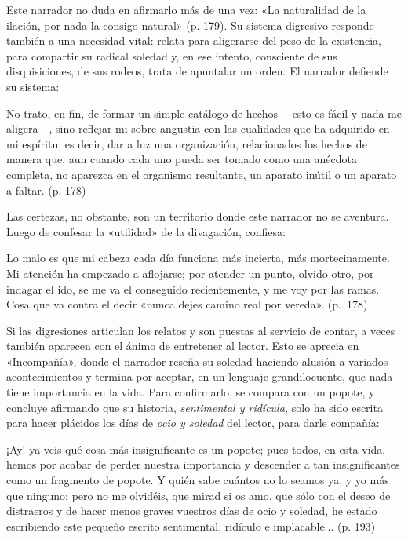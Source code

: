 \documentclass[14pt,twoside,final]{extbook} %
\begin{document}
Este narrador no duda en afirmarlo más de una vez: «La naturalidad de la ilación, por nada la consigo natural» (p. 179). Su sistema digresivo responde también a una necesidad vital: relata para
aligerarse del peso de la existencia, para compartir su radical soledad y, en ese intento, consciente de sus disquisiciones, de sus rodeos, trata de apuntalar un orden. El narrador defiende su sistema:
\begin{quoting}
No trato, en fin, de formar un simple catálogo de hechos ---esto es fácil y nada me aligera---, sino reflejar mi sobre angustia con las cualidades que ha adquirido en mi espíritu, es decir, dar a luz una organización, relacionados los hechos de manera que, aun cuando cada uno pueda ser tomado como una anécdota completa, no aparezca en el organismo resultante, un aparato inútil o un aparato a faltar. (p. 178)
\end{quoting}
Las certezas, no obstante, son un territorio donde este narrador no se aventura. Luego de confesar la «utilidad» de la divagación, confiesa:
\begin{quoting}
Lo malo es que mi cabeza cada día funciona más incierta, más mortecinamente. Mi atención ha empezado a aflojarse; por atender un punto, olvido otro, por indagar el ido, se me va el conseguido recientemente, y me voy por las ramas. Cosa que va contra el decir «nunca dejes camino real por vereda». (p.~178)
\end{quoting}
Si las digresiones articulan los relatos y son puestas al servicio de contar, a veces también aparecen con el ánimo de entretener al lector. Esto se aprecia en «Incompañía», donde el narrador reseña su soledad haciendo alusión a variados acontecimientos y termina por aceptar, en un lenguaje grandilocuente, que nada tiene importancia en la vida. Para confirmarlo, se compara con un popote, y concluye afirmando que su historia, \emph{sentimental y ridícula,} solo ha sido escrita para hacer plácidos los días de \emph{ocio y soledad} del lector, para darle compañía:
\begin{quoting}
¡Ay! ya veis qué cosa más insignificante es un popote; pues todos, en esta vida, hemos por acabar de perder nuestra importancia y descender a tan insignificantes como un fragmento de popote. Y quién sabe cuántos no lo seamos ya, y yo más que ninguno; pero no me olvidéis, que mirad si os amo, que sólo con el deseo de distraeros y de hacer menos graves vuestros días de ocio y soledad, he estado
escribiendo este pequeño escrito sentimental, ridículo e implacable... (p. 193)
\end{quoting}
\end{document}
